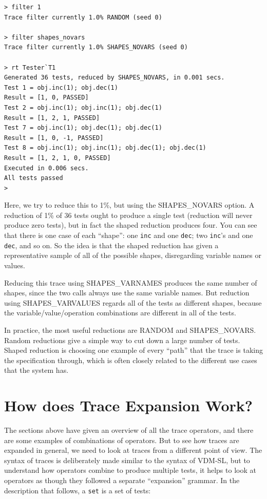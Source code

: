 \documentclass{overturerepchap}
\begin{document}
\lstset{style=tool,language=}
\begin{lstlisting}
> filter 1
Trace filter currently 1.0% RANDOM (seed 0)

> filter shapes_novars
Trace filter currently 1.0% SHAPES_NOVARS (seed 0)

> rt Tester`T1
Generated 36 tests, reduced by SHAPES_NOVARS, in 0.001 secs. 
Test 1 = obj.inc(1); obj.dec(1)
Result = [1, 0, PASSED]
Test 2 = obj.inc(1); obj.inc(1); obj.dec(1)
Result = [1, 2, 1, PASSED]
Test 7 = obj.inc(1); obj.dec(1); obj.dec(1)
Result = [1, 0, -1, PASSED]
Test 8 = obj.inc(1); obj.inc(1); obj.dec(1); obj.dec(1)
Result = [1, 2, 1, 0, PASSED]
Executed in 0.006 secs. 
All tests passed
>
\end{lstlisting}
\lstset{style=mystyle}
\lstset{language=VDM++}
\normalsize

Here, we try to reduce this to 1\%, but using the SHAPES\_NOVARS option. A
reduction of 1\% of 36 tests ought to produce a single test (reduction will
never produce zero tests), but in fact the shaped reduction produces four. You
can see that there is one case of each ``shape'': one \texttt{inc} and one \texttt{dec}; two \texttt{inc}'s
and one \texttt{dec}, and so on. So the idea is that the shaped reduction has given a
representative sample of all of the possible shapes, disregarding variable names
or values.

Reducing this trace using SHAPES\_VARNAMES produces the same number of shapes,
since the two calls always use the same variable names. But reduction using
SHAPES\_VARVALUES regards all of the tests as different shapes, because the
variable/value/operation combinations are different in all of the tests.

In practice, the most useful reductions are RANDOM and SHAPES\_NOVARS. Random
reductions give a simple way to cut down a large number of tests. Shaped
reduction is choosing one example of every ``path'' that the trace is taking the
specification through, which is often closely related to the different use cases
that the system has.


\section{How does Trace Expansion Work?}

The sections above have given an overview of all the trace operators, and there
are some examples of combinations of operators. But to see how traces are
expanded in general, we need to look at traces from a different point of view.
The syntax of traces is deliberately made similar to the syntax of VDM-SL, but
to understand how operators combine to produce multiple tests, it helps to look
at operators as though they followed a separate ``expansion'' grammar. In the
description that follows, a \texttt{set} is a set of tests:
\end{document}
